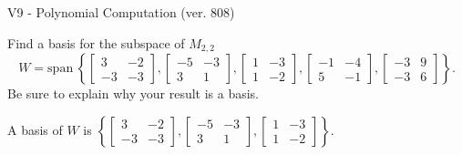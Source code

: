 \begin{exercise}
  \begin{exerciseTitle}V9 - Polynomial Computation (ver. 808)\end{exerciseTitle}
  \begin{exerciseStatement}
    Find a basis for the subspace of \(M_{2,2}\) 
\[W=\mathrm{span}\ \left\{\left[\begin{array}{cc}
3 & -2 \\
-3 & -3
\end{array}\right] , \left[\begin{array}{cc}
-5 & -3 \\
3 & 1
\end{array}\right] , \left[\begin{array}{cc}
1 & -3 \\
1 & -2
\end{array}\right] , \left[\begin{array}{cc}
-1 & -4 \\
5 & -1
\end{array}\right] , \left[\begin{array}{cc}
-3 & 9 \\
-3 & 6
\end{array}\right]\right\}.\]
 Be sure to explain why your result is a basis.


  \end{exerciseStatement}
  \begin{exerciseAnswer}
   A basis of \(W\) is  \(\left\{\left[\begin{array}{cc}
3 & -2 \\
-3 & -3
\end{array}\right] , \left[\begin{array}{cc}
-5 & -3 \\
3 & 1
\end{array}\right] , \left[\begin{array}{cc}
1 & -3 \\
1 & -2
\end{array}\right]\right\}\).
  


  \end{exerciseAnswer}
\end{exercise}